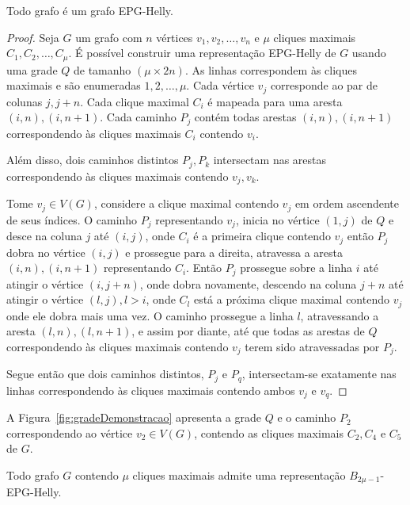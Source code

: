 \begin{lema}\label{lem:todoGrafoEpgHelly}
 Todo grafo é um grafo EPG-Helly.
 \end{lema}
  \begin{proof}
  Seja $G$ um grafo com $n$ vértices $v_1, v_2, \dots, v_n$ e $\mu$ cliques maximais $C_1, C_2, \dots , C_{\mu }$. É possível construir uma representação EPG-Helly de $G$ usando uma grade $Q$ de tamanho $(\mu \times 2n)$. As linhas correspondem às cliques maximais e são enumeradas $1, 2, \dots , \mu$. Cada vértice $v_j$ corresponde ao par de colunas $j, j+n$. Cada clique maximal  $C_i$ é mapeada para uma aresta $(i,n), (i,n+1)$. Cada caminho $P_j$ contém todas arestas $(i,n), (i,n+1)$ correspondendo às cliques maximais $C_i$ contendo $v_i$.
  
  Além disso, dois caminhos distintos $P_j,P_k$ intersectam nas arestas correspondendo às cliques maximais contendo $v_j,v_k$.
  
  Tome $v_j \in V(G)$, considere a clique maximal contendo $v_j$ em ordem ascendente de seus índices. O caminho $P_j$ representando $v_j$, inicia no vértice $(1,j)$ de $Q$ e desce na coluna $j$ até $(i,j)$, onde $C_i$ é a primeira clique contendo $v_j$ então $P_j$ dobra no vértice  $(i,j)$ e prossegue para a direita, atravessa a aresta $(i,n), (i,n+1)$ representando $C_i$. Então $P_j$ prossegue  sobre a linha $i$ até atingir o vértice  $(i, j+n)$, onde dobra novamente, descendo na coluna $j+n$ até atingir o vértice $(l,j), l>i$, onde $C_l$ está a próxima clique maximal contendo  $v_j$ onde ele dobra mais uma vez. O caminho prossegue a linha $l$, atravessando a aresta $(l,n),(l,n+1)$, e assim por diante, até que todas as arestas de $Q$ correspondendo às cliques maximais contendo $v_j$ terem sido atravessadas por $P_j$.   
  
Segue então que dois caminhos distintos, $P_j$ e $P_q$, intersectam-se exatamente nas linhas correspondendo às cliques maximais contendo ambos $v_j$ e $v_q$.  
  \end{proof}
 
 A Figura~\ref{fig:gradeDemonstracao} apresenta a grade $Q$ e o caminho $P_2$ correspondendo ao vértice $v_2 \in V(G)$, contendo as cliques maximais  $C_2, C_4$ e $C_5$ de $G$.
 
  
 
 
 
 \begin{corollary}
 Todo grafo $G$ contendo  $\mu$ cliques maximais admite uma representação $B_{2\mu -1}$-EPG-Helly. %
 \end{corollary}
 

